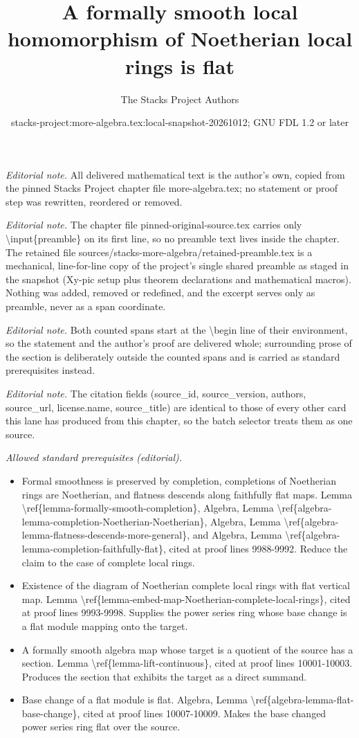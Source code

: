 \documentclass[10pt,a4paper]{amsart}
\title{A formally smooth local homomorphism of Noetherian local rings is flat}
\author{The Stacks Project Authors}
\date{stacks-project:more-algebra.tex:local-snapshot-20261012; GNU FDL 1.2 or later}
\theoremstyle{plain}
\theoremstyle{definition}
\theoremstyle{remark}
\numberwithin{equation}{subsection}
\begin{document}
\maketitle
\setcounter{subsection}{1}
\noindent\textit{Editorial note.} All delivered mathematical text is the author's own, copied from the pinned Stacks Project chapter file more-algebra.tex; no statement or proof step was rewritten, reordered or removed.\par\medskip
\noindent\textit{Editorial note.} The chapter file pinned-original-source.tex carries only \textbackslash{}input\{preamble\} on its first line, so no preamble text lives inside the chapter. The retained file sources/stacks-more-algebra/retained-preamble.tex is a mechanical, line-for-line copy of the project's single shared preamble as staged in the snapshot (Xy-pic setup plus theorem declarations and mathematical macros). Nothing was added, removed or redefined, and the excerpt serves only as preamble, never as a span coordinate.\par\medskip
\noindent\textit{Editorial note.} Both counted spans start at the \textbackslash{}begin line of their environment, so the statement and the author's proof are delivered whole; surrounding prose of the section is deliberately outside the counted spans and is carried as standard prerequisites instead.\par\medskip
\noindent\textit{Editorial note.} The citation fields (source\_id, source\_version, authors, source\_url, license.name, source\_title) are identical to those of every other card this lane has produced from this chapter, so the batch selector treats them as one source.\par\medskip
\noindent\textit{Allowed standard prerequisites (editorial).}\begin{itemize}
\item Formal smoothness is preserved by completion, completions of Noetherian rings are Noetherian, and flatness descends along faithfully flat maps. Lemma \textbackslash{}ref\{lemma-formally-smooth-completion\}, Algebra, Lemma \textbackslash{}ref\{algebra-lemma-completion-Noetherian-Noetherian\}, Algebra, Lemma \textbackslash{}ref\{algebra-lemma-flatness-descends-more-general\}, and Algebra, Lemma \textbackslash{}ref\{algebra-lemma-completion-faithfully-flat\}, cited at proof lines 9988-9992. Reduce the claim to the case of complete local rings.
\item Existence of the diagram of Noetherian complete local rings with flat vertical map. Lemma \textbackslash{}ref\{lemma-embed-map-Noetherian-complete-local-rings\}, cited at proof lines 9993-9998. Supplies the power series ring whose base change is a flat module mapping onto the target.
\item A formally smooth algebra map whose target is a quotient of the source has a section. Lemma \textbackslash{}ref\{lemma-lift-continuous\}, cited at proof lines 10001-10003. Produces the section that exhibits the target as a direct summand.
\item Base change of a flat module is flat. Algebra, Lemma \textbackslash{}ref\{algebra-lemma-flat-base-change\}, cited at proof lines 10007-10009. Makes the base changed power series ring flat over the source.
\end{itemize}\medskip
\end{document}
